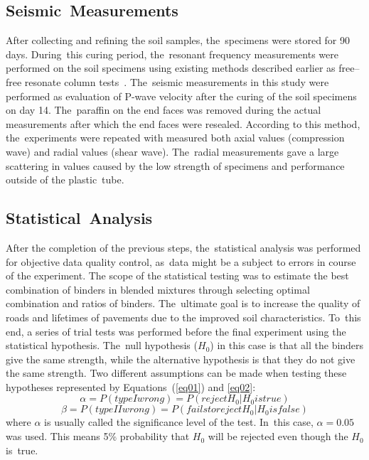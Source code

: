 \documentclass[constrmater,article,accept,pdftex,moreauthors]{Definitions/mdpi}
\begin{document}
\subsection{Seismic~Measurements}
After collecting and refining the soil samples, the~specimens were stored for 90 days. During~this {curing} period, the~resonant frequency measurements were performed on the soil specimens using existing methods described earlier as free--free resonate column tests~\citep{Aldaood,Lindh2021b,Lindh2022c,ThomasRangaswamy,Ryden}. The~seismic measurements in this study were performed as evaluation of P-wave velocity after the {curing} of the {soil }specimens on day 14. The~paraffin on the end faces was removed during the actual measurements after which the end faces were resealed. According to this method, the~experiments were repeated with measured both axial values (compression wave) and radial values (shear wave). The~radial measurements gave a large scattering in values caused by the low strength of specimens and performance outside of the plastic~tube.

\subsection{Statistical~Analysis}
After the completion of the previous steps, the~statistical analysis was performed for objective data quality control, as~data might be a subject to errors in course of the experiment. {The scope of the statistical testing was to estimate the best combination of binders in blended mixtures through selecting optimal combination and ratios of binders. The~ultimate goal is to increase the quality of roads and lifetimes of pavements due to the improved soil characteristics. To~this end,} a series of trial tests {was} performed before the final experiment{ }using the statistical hypothesis. The~null hypothesis ($H_0$) in this case is that all the binders give the same strength, while the alternative hypothesis is that they do not give the same strength. Two different assumptions can be made when testing these hypotheses represented by Equations~(\ref{eq01}) and \ref{eq02}:
\begin{equation}\label{eq01}
	\alpha = P (type I wrong) = P(reject H_0 | H_0 is true)
\end{equation}
\vspace{-12pt}
\begin{equation}\label{eq02}
	\beta = P (type II wrong) = P(fails to reject H_0 | H_0 is false)
\end{equation}
where $\alpha$ is usually called the significance level of the test. In~this case, $\alpha = 0.05 $ was used. This means 5\% probability that $H_0$ will be rejected even though the $H_0$ is~true. 
\end{document}
